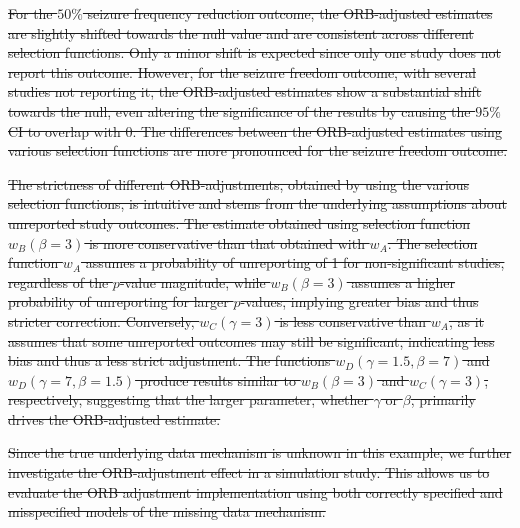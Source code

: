 \documentclass[twocolumn]{article}\usepackage[]{graphicx}\usepackage[]{xcolor}
\providecommand{\DIFdeltex}[1]{{\protect\color{red}\sout{#1}}}                      %
\providecommand{\DIFdelend}{} %
\providecommand{\DIFdel}[1]{\texorpdfstring{\DIFdeltex{#1}}{}} %
\DeclareRobustCommand{\DIFdelend}{\DIFOaddend \let\includegraphics\DIFOincludegraphics} %
\begin{document}
\DIFdel{For the $50\%$ seizure frequency reduction outcome, the ORB-adjusted estimates are slightly shifted towards the null value and are consistent across different selection functions. Only a minor shift is expected since only one study does not report this outcome. However, for the seizure freedom outcome, with several studies not reporting it, the ORB-adjusted estimates show a substantial shift towards the null, even altering the significance of the results by causing the $95\%$ CI to overlap with 0. The differences between the ORB-adjusted estimates using various selection functions are more pronounced for the seizure freedom outcome. }%

\DIFdel{The strictness of different ORB-adjustments, obtained by using the various selection functions, is intuitive and stems from the underlying assumptions about unreported study outcomes. The estimate obtained using selection function $w_B(\beta=3)$ is more conservative than that obtained with $w_A$. The selection function $w_A$ assumes a probability of unreporting of 1 for non-significant studies, regardless of the $p$-value magnitude, while $w_B(\beta=3)$ assumes a higher probability of unreporting for larger $p$-values, implying greater bias and thus stricter correction. Conversely, $w_C(\gamma=3)$ is less conservative than $w_A$, as it assumes that some unreported outcomes may still be significant, indicating less bias and thus a less strict adjustment. The functions $w_D(\gamma=1.5, \beta=7)$ and $w_D(\gamma=7, \beta=1.5)$ produce results similar to $w_B(\beta=3)$ and $w_C(\gamma=3)$, respectively, suggesting that the larger parameter, whether $\gamma$ or $\beta$, primarily drives the ORB-adjusted estimate. }%

\DIFdel{Since the true underlying data mechanism is unknown in this example, we further investigate the ORB-adjustment effect in a simulation study. This allows us to evaluate the ORB adjustment implementation using both correctly specified and misspecified models of the missing data mechanism.
}\DIFdelend %
\end{document}
